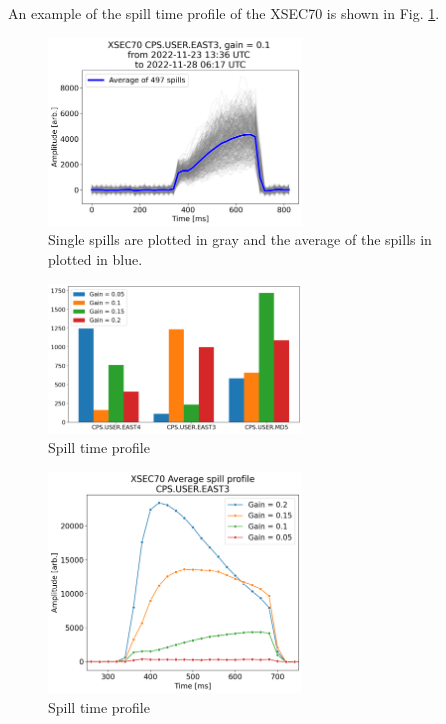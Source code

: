 An example of the spill time profile of the XSEC70 is shown in Fig. \ref{fig:spill_time_profile1}.

\begin{figure}[!htb]
\centering
\includegraphics[width=0.6\textwidth]{images/spill_profile_xsec_CPS.USER.EAST3_0.1_1.png}
\caption{Single spills are plotted in gray and the average of the spills in plotted in blue.}
\label{fig:spill_time_profile1}
\end{figure}

\begin{figure}[!htb]
\centering
\includegraphics[width=0.6\textwidth]{images/bar_chart_gain_energy.png}
\caption{Spill time profile}
\label{fig:spill_time_profile2}
\end{figure}

\begin{figure}[!htb]
\centering
\includegraphics[width=0.6\textwidth]{images/spill_profile_xsec70_average_EAST3.png}
\caption{Spill time profile}
\label{fig:spill_time_profile3}
\end{figure}

